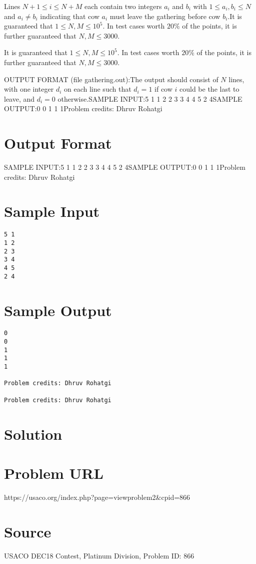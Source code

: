 \documentclass[12pt]{article}
\begin{document}
Lines $N+1 \leq i \leq N+M$ each contain two integers $a_i$ and $b_i$ with
$1 \leq a_i, b_i \leq N$ and $a_i \neq b_i$ indicating that cow $a_i$ must leave
the gathering before cow $b_i$.It is guaranteed that $1 \leq N, M \leq 10^5$. In test cases worth $20\%$
of the points, it is further guaranteed that $N, M \leq 3000$.

It is guaranteed that $1 \leq N, M \leq 10^5$. In test cases worth $20\%$
of the points, it is further guaranteed that $N, M \leq 3000$.

OUTPUT FORMAT (file gathering.out):The output should consist of $N$ lines, with one integer $d_i$ on each line such
that $d_i = 1$ if cow $i$ could be the last to leave, and $d_i = 0$ otherwise.SAMPLE INPUT:5 1
1 2
2 3
3 4
4 5
2 4SAMPLE OUTPUT:0
0
1
1
1Problem credits: Dhruv Rohatgi

\section*{Output Format}
SAMPLE INPUT:5 1
1 2
2 3
3 4
4 5
2 4SAMPLE OUTPUT:0
0
1
1
1Problem credits: Dhruv Rohatgi

\section*{Sample Input}
\begin{verbatim}
5 1
1 2
2 3
3 4
4 5
2 4
\end{verbatim}

\section*{Sample Output}
\begin{verbatim}
0
0
1
1
1

Problem credits: Dhruv Rohatgi

Problem credits: Dhruv Rohatgi
\end{verbatim}

\section*{Solution}


\section*{Problem URL}
https://usaco.org/index.php?page=viewproblem2&cpid=866

\section*{Source}
USACO DEC18 Contest, Platinum Division, Problem ID: 866
\end{document}
